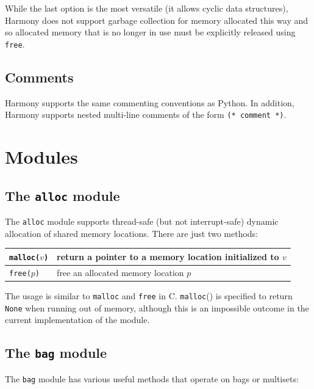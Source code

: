 \documentclass{report}
\begin{document}
While the last option is the most versatile (it allows cyclic
data structures), Harmony does not support garbage collection
for memory allocated this way and so allocated memory that is no
longer in use must be explicitly released using \texttt{free}.

\section{Comments}

Harmony supports the same commenting conventions as Python.
In addition, Harmony supports nested multi-line comments
of the form \texttt{(* comment *)}.

\chapter{Modules}
\label{ap:module}

\section{The \texttt{alloc} module}

The \texttt{alloc} module
%
supports thread-safe (but not interrupt-safe) dynamic allocation of
shared memory locations.  There are just two methods:

\vspace{1em}
\begin{tabular}{|l|l|}
\hline
\texttt{malloc($v$)} & return a pointer to a memory location initialized to $v$ \\
\hline
\texttt{free($p$)} & free an allocated memory location $p$ \\
\hline
\end{tabular}
\vspace{1em}

The usage is similar to \texttt{malloc} and \texttt{free} in C.
\texttt{malloc}() is specified to return \texttt{None} when running out of
memory, although this is an impossible outcome in the current
implementation of the module.

\section{The \texttt{bag} module}
\label{ap:bag}

The \texttt{bag} module
%
has various useful methods that operate on bags or
multisets:
\end{document}
